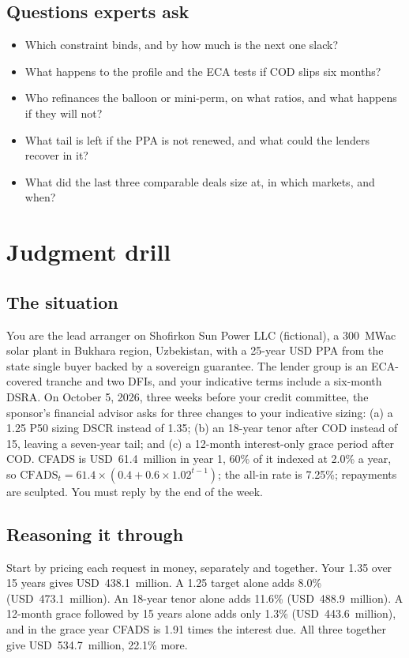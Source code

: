 \subsection*{Questions experts ask}
\begin{itemize}
\item Which constraint binds, and by how much is the next one slack?
\item What happens to the profile and the ECA tests if COD slips six months?
\item Who refinances the balloon or mini-perm, on what ratios, and what happens if they will not?
\item What tail is left if the PPA is not renewed, and what could the lenders recover in it?
\item What did the last three comparable deals size at, in which markets, and when?
\end{itemize}

\section{Judgment drill}\label{sec:36.14}

\subsection*{The situation}
You are the lead arranger on Shofirkon Sun Power LLC (fictional), a 300~MWac solar plant in Bukhara region, Uzbekistan, with a 25-year USD PPA from the state single buyer backed by a sovereign guarantee. The lender group is an ECA-covered tranche and two DFIs, and your indicative terms include a six-month DSRA. On October 5, 2026, three weeks before your credit committee, the sponsor's financial advisor asks for three changes to your indicative sizing: (a) a 1.25\x{} P50 sizing DSCR instead of 1.35\x; (b) an 18-year tenor after COD instead of 15, leaving a seven-year tail; and (c) a 12-month interest-only grace period after COD. CFADS is USD~61.4~million in year 1, 60\% of it indexed at 2.0\% a year, so $\mathrm{CFADS}_t = 61.4 \times (0.4 + 0.6 \times 1.02^{t-1})$; the all-in rate is 7.25\%; repayments are sculpted. You must reply by the end of the week.

\subsection*{Reasoning it through}
Start by pricing each request in money, separately and together. Your 1.35\x{} over 15 years gives USD~438.1~million. A 1.25\x{} target alone adds 8.0\% (USD~473.1~million). An 18-year tenor alone adds 11.6\% (USD~488.9~million). A 12-month grace followed by 15 years alone adds only 1.3\% (USD~443.6~million), and in the grace year CFADS is 1.91 times the interest due. All three together give USD~534.7~million, 22.1\% more.

